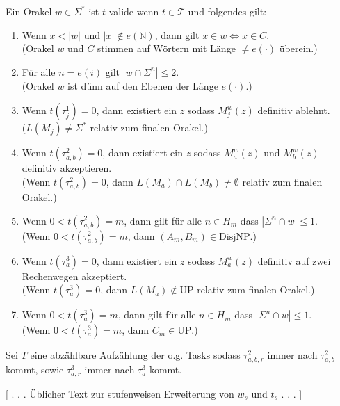 \documentclass[nofonts]{uebung}
\def\UP{\ensuremath{\mathrm{UP}}}
\def\DisjNP{\ensuremath{\mathrm{DisjNP}}}
\begin{document}
Ein Orakel $w\in\Sigma^*$ ist $t$-valide wenn $t\in\mathcal T$ und folgendes gilt:
\begin{enumerate}[label={V\arabic*}]
    \item Wenn $x<|w|$ und $|x|\not\in e(\mathbb N)$, dann gilt $x\in w\iff x\in C$.\\
        (Orakel $w$ und $C$ stimmen auf Wörtern mit Länge $\neq e(\cdot)$ überein.)
    \item Für alle $n=e(i)$ gilt $|w\cap \Sigma^n|\leq 2$.\\
        (Orakel $w$ ist dünn auf den Ebenen der Länge $e(\cdot)$.)
    \item Wenn $t(\tau^1_j)=0$, dann existiert ein $z$ sodass $M_j^w(z)$ definitiv ablehnt.\\
        ($L(M_j)\neq \Sigma^*$ relativ zum finalen Orakel.)
    \item Wenn $t(\tau^2_{a,b})=0$, dann existiert ein $z$ sodass $M_a^w(z)$ und $M_b^w(z)$ definitiv akzeptieren.\\
        (Wenn $t(\tau^2_{a,b})=0$, dann $L(M_a)\cap L(M_b)\neq \emptyset$ relativ zum finalen Orakel.)
    \item Wenn $0<t(\tau^2_{a,b})=m$, dann gilt für alle $n\in H_m$ dass $|\Sigma^{n}\cap w|\leq 1$.\\
        (Wenn $0<t(\tau^2_{a,b})=m$, dann $(A_m,B_m)\in\DisjNP$.)
    \item Wenn $t(\tau^3_{a})=0$, dann existiert ein $z$ sodass $M_a^w(z)$ definitiv auf zwei Rechenwegen akzeptiert.\\
        (Wenn $t(\tau^3_{a})=0$, dann $L(M_a)\not\in \UP$ relativ zum finalen Orakel.)
    \item Wenn $0<t(\tau^3_{a})=m$, dann gilt für alle $n\in H_m$ dass $|\Sigma^n\cap w|\leq 1$.\\
        (Wenn $0<t(\tau^3_{a})=m$, dann $C_m\in\UP$.)
\end{enumerate}

Sei $T$ eine abzählbare Aufzählung der o.g. Tasks sodass $\tau^2_{a,b,r}$ immer nach $\tau^2_{a,b}$ kommt, sowie $\tau^3_{a,r}$ immer nach $\tau^3_a$ kommt.

[ . . . Üblicher Text zur stufenweisen Erweiterung von $w_s$ und $t_s$ . . . ]
\end{document}

